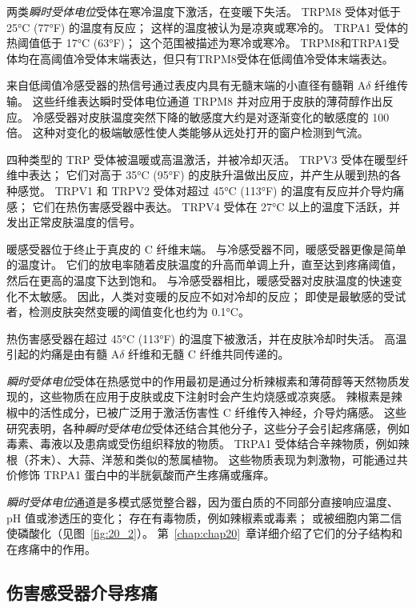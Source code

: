 两类\textit{瞬时受体电位}受体在寒冷温度下激活，在变暖下失活。
TRPM8 受体对低于 25°C (77°F) 的温度有反应； 这样的温度被认为是凉爽或寒冷的。
TRPA1 受体的热阈值低于 17°C (63°F)；
这个范围被描述为寒冷或寒冷。
TRPM8和TRPA1受体均在高阈值冷受体末端表达，但只有TRPM8受体在低阈值冷受体末端表达。


来自低阈值冷感受器的热信号通过表皮内具有无髓末端的小直径有髓鞘 A$\delta$ 纤维传输。
这些纤维表达瞬时受体电位通道 TRPM8 并对应用于皮肤的薄荷醇作出反应。
冷感受器对皮肤温度突然下降的敏感度大约是对逐渐变化的敏感度的 100 倍。
这种对变化的极端敏感性使人类能够从远处打开的窗户检测到气流。


四种类型的 TRP 受体被温暖或高温激活，并被冷却灭活。
TRPV3 受体在暖型纤维中表达； 它们对高于 35°C (95°F) 的皮肤升温做出反应，并产生从暖到热的各种感觉。
TRPV1 和 TRPV2 受体对超过 45°C (113°F) 的温度有反应并介导灼痛感；
它们在热伤害感受器中表达。 
TRPV4 受体在 27°C 以上的温度下活跃，并发出正常皮肤温度的信号。


暖感受器位于终止于真皮的 C 纤维末端。
与冷感受器不同，暖感受器更像是简单的温度计。
它们的放电率随着皮肤温度的升高而单调上升，直至达到疼痛阈值，然后在更高的温度下达到饱和。
与冷感受器相比，暖感受器对皮肤温度的快速变化不太敏感。
因此，人类对变暖的反应不如对冷却的反应；
即使是最敏感的受试者，检测皮肤突然变暖的阈值变化也约为 0.1°C。


热伤害感受器在超过 45°C (113°F) 的温度下被激活，并在皮肤冷却时失活。
高温引起的灼痛是由有髓 A$\delta$ 纤维和无髓 C 纤维共同传递的。


\textit{瞬时受体电位}受体在热感觉中的作用最初是通过分析辣椒素和薄荷醇等天然物质发现的，这些物质在应用于皮肤或皮下注射时会产生灼烧感或凉爽感。
辣椒素是辣椒中的活性成分，已被广泛用于激活伤害性 C 纤维传入神经，介导灼痛感。
这些研究表明，各种\textit{瞬时受体电位}受体还结合其他分子，这些分子会引起疼痛感，例如毒素、毒液以及患病或受伤组织释放的物质。
TRPA1 受体结合辛辣物质，例如辣根（芥末）、大蒜、洋葱和类似的葱属植物。
这些物质表现为刺激物，可能通过共价修饰 TRPA1 蛋白中的半胱氨酸而产生疼痛或瘙痒。


\textit{瞬时受体电位}通道是多模式感觉整合器，因为蛋白质的不同部分直接响应温度、pH 值或渗透压的变化；
存在有毒物质，例如辣椒素或毒素；
或被细胞内第二信使磷酸化（见图~\ref{fig:20_2}）。
第~\ref{chap:chap20}~章详细介绍了它们的分子结构和在疼痛中的作用。



\subsection{伤害感受器介导疼痛}

